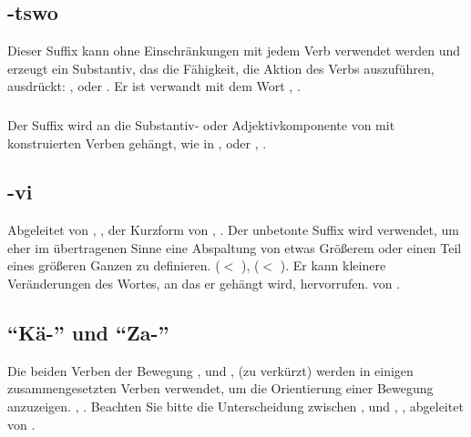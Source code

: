 \subsection{-tswo} Dieser Suffix kann ohne Einschr\"ankungen mit jedem Verb verwendet
werden und erzeugt ein Substantiv, das die F\"ahigkeit, die Aktion des Verbs auszuf\"uhren,
ausdr\"uckt: ,  oder  .
Er ist verwandt mit dem Wort , .

\subsubsection{} Der Suffix  wird an die Substantiv- oder Adjektivkomponente
von mit  konstruierten Verben geh\"angt, wie in ,  oder , .

\subsection{-vi} Abgeleitet von , , der Kurzform von , .
Der unbetonte Suffix  wird verwendet, um eher im \"ubertragenen Sinne eine
Abspaltung von etwas Gr\"o\ss{}erem oder einen Teil eines gr\"o\ss{}eren Ganzen zu
definieren.
  ($<$  ), 
 ($<$  ).
Er kann kleinere Ver\"anderungen des Wortes, an das er geh\"angt wird, hervorrufen.
  von  .

\subsection{"`K\"a-"' und "`Za-"'} Die beiden Verben der Bewegung , 
und ,  (zu  verk\"urzt) werden in einigen zusammengesetzten
Verben verwendet, um die Orientierung einer Bewegung anzuzeigen.
, . Beachten Sie bitte die Unterscheidung zwischen
,  und , , abgeleitet von
 .


